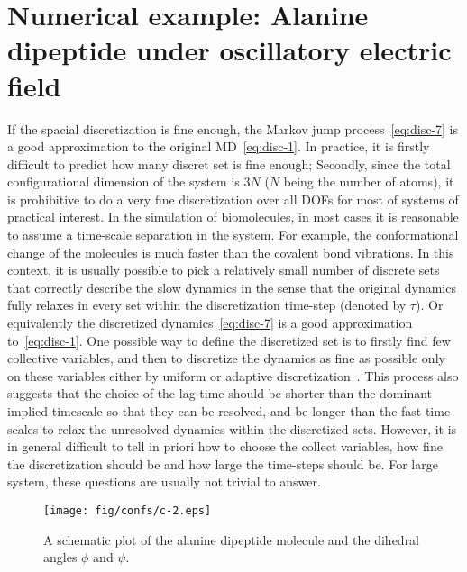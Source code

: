 \documentclass[aps, pre, preprint,unsortedaddress,a4paper,onecolumn]{revtex4}
\begin{document}
\section{Numerical example:
  Alanine dipeptide under oscillatory electric field}

If the spacial discretization is fine enough, the Markov jump
process~\eqref{eq:disc-7} is a good approximation to the original
MD~\eqref{eq:disc-1}.  In practice, it is firstly difficult to predict
how many discret set is fine enough; Secondly, since the
total configurational dimension of the system is $3N$ ($N$ being the
number of atoms), it is prohibitive to do a very fine discretization
over all DOFs for most of systems of practical interest.  In the
simulation of biomolecules, in most cases it is reasonable to assume a
time-scale separation in the system.
For example, the conformational
change of the molecules is much faster than the covalent bond
vibrations. 
In this context,
it is usually possible to pick a relatively small number of discrete sets that
correctly describe the slow dynamics in the sense that
the original dynamics fully relaxes in every set
within the discretization time-step (denoted by $\tau$). Or equivalently the discretized
dynamics~\eqref{eq:disc-7} is a good approximation to~\eqref{eq:disc-1}.
One possible way to define the discretized set is to firstly find few collective
variables, and then to discretize the dynamics as fine as possible only on these
variables either by uniform or adaptive
discretization~\cite{chodera2007automatic, prinz2011markov}.
This process also suggests that the choice of the lag-time should be 
shorter than the dominant implied timescale so that they can be resolved,
and be longer than the fast time-scales to relax the unresolved dynamics
within the discretized sets.
However, it is in general difficult to tell in priori how to choose the collect
variables, how fine the discretization should be and how large
the time-steps should be.
For large system, these questions are usually
not trivial to answer. 

\begin{figure}
  \centering
  \texttt{[image: fig/confs/c-2.eps]}
  \caption{A schematic plot of the alanine dipeptide molecule and the dihedral angles $\phi$ and $\psi$.}
  \label{fig:tmp1}
\end{figure}
\end{document}
